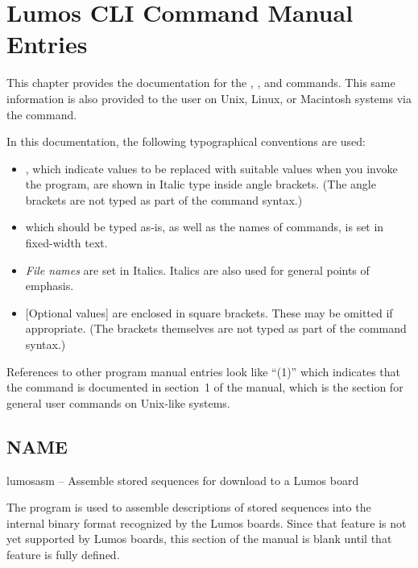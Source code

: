 \documentclass[letterpaper,twoside,onecolumn,openright,final]{memoir}
\begin{document}
\chapter{Lumos CLI Command Manual Entries}\label{ch:lumosctl}
This chapter provides the documentation for the , , and  commands.  
This same information is also
provided to the  user on Unix, Linux, or Macintosh systems via the  command.  

In this documentation, the following typographical conventions are used:
\begin{itemize}
	\item	{}, which indicate values to be replaced with suitable values when you
		invoke the program, are shown in Italic type inside angle brackets.  (The angle brackets
		are not typed as part of the command syntax.)
	\item	{} which should be typed as-is, as well as the names of commands, is set
		in fixed-width text.
	\item	\emph{File names} are set in Italics.  Italics are also used for general points of emphasis.
	\item	{}[Optional values] are enclosed in square brackets.  These may be omitted if appropriate.
		(The brackets themselves are not typed as part of the command syntax.)
\end{itemize}
References to other program manual entries look like ``(1)'' which indicates that the
 command is documented in section~1 of the manual, which is the section for general 
user commands on Unix-like systems.
\newpage
{}
\section{NAME}
\noindent lumosasm -- Assemble stored sequences for download to a Lumos board

\medskip

\begin{NotImplemented*}{The  program is used to assemble descriptions of stored
sequences into the internal binary format recognized by the Lumos boards.  Since that feature is
not yet supported by Lumos boards, this section of the manual is blank until that feature is
fully defined.}
%
\end{NotImplemented*}
\newpage
{}

\newpage
{}
\label{man:lumosupgrade}

\end{document}
